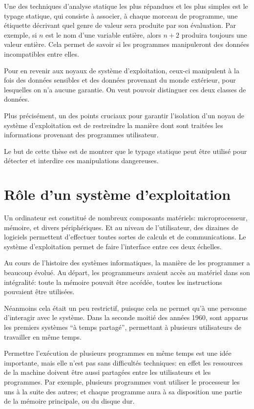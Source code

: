 Une des techniques d'analyse statique les plus répandues et les plus simples est
le typage statique, qui consiste à associer, à chaque morceau de programme, une
étiquette décrivant quel genre de valeur sera produite par son évaluation. Par
exemple, si $n$ est le nom d'une variable entière, alors $n + 2$ produira
toujours une valeur entière.
Cela permet de savoir si les programmes manipuleront des données incompatibles
entre elles.


Pour en revenir aux noyaux de système d'exploitation, ceux-ci manipulent à la
fois des données sensibles et des données provenant du monde extérieur, pour
lesquelles on n'a aucune garantie. On veut pouvoir distinguer ces deux classes
de données.

Plus précisément, un des points cruciaux pour garantir l'isolation d'un noyau de
système d'exploitation est de restreindre la manière dont sont traitées les
informations provenant des programmes utilisateur.

Le but de cette thèse est de montrer que le typage statique peut être utilisé
pour détecter et interdire ces manipulations dangereuses.

\section{Rôle d'un système d'exploitation}

Un ordinateur est constitué de nombreux composants matériels: microprocesseur,
mémoire, et divers périphériques. Et au niveau de l'utilisateur, des dizaines de
logiciels permettent d'effectuer toutes sortes de calculs et de communications.
Le système d'exploitation permet de faire l'interface entre ces deux échelles.

Au cours de l'histoire des systèmes informatiques, la manière de les programmer
a beaucoup évolué. Au départ, les programmeurs avaient accès au matériel dans
son intégralité: toute la mémoire pouvait être accédée, toutes les instructions
pouvaient être utilisées.

Néanmoins cela était un peu restrictif, puisque cela ne permet qu'à une
personne d'interagir avec le système. Dans la seconde moitié des années 1960,
sont apparus les premiers systèmes \enquote{à temps partagé}, permettant à
plusieurs utilisateurs de travailler en même temps.

Permettre l'exécution de plusieurs programmes en même temps est une idée
importante, mais elle n'est pas sans difficultés techniques: en effet les
ressources de la machine doivent être aussi partagées entre les utilisateurs et
les programmes. Par exemple, plusieurs programmes vont utiliser le processeur
les uns à la suite des autres; et chaque programme aura à sa disposition une
partie de la mémoire principale, ou du disque dur.

